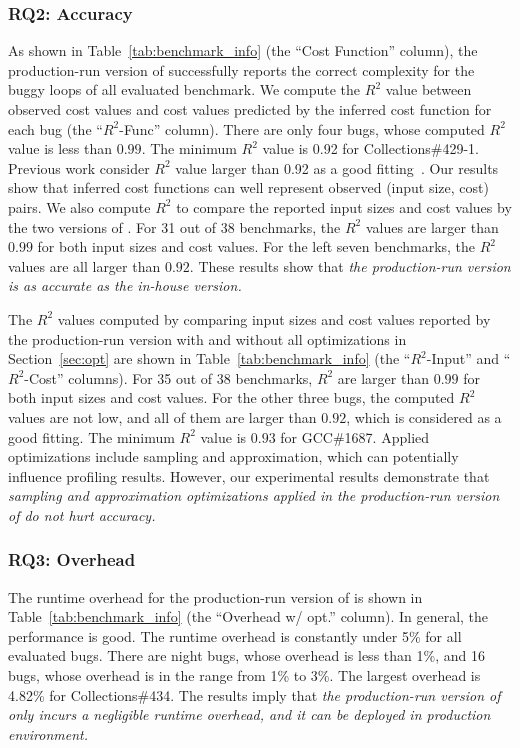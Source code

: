 \subsubsection{RQ2: Accuracy}
As shown in Table~\ref{tab:benchmark_info} (the ``Cost Function'' column),
the production-run version of \Tool successfully 
reports the correct complexity for the buggy loops of 
all evaluated benchmark. 
We compute the $R^2$ value between observed cost values and 
cost values predicted by the inferred cost function for each bug 
(the ``$R^2$-Func'' column).  
There are only four bugs, whose computed $R^2$ value is less than $0.99$.
The minimum $R^2$ value is 0.92 for Collections\#429-1. 
Previous work consider $R^2$ value larger than 0.92 
as a good fitting~\cite{rsquare-value}.
Our results show that inferred cost functions can well represent 
observed (input size, cost) pairs. 
We also compute $R^2$ to compare the reported input sizes 
and cost values by the two versions of \Tool. 
For 31 out of 38 benchmarks, 
the $R^2$ values are larger than $0.99$ for both input sizes and cost values. 
For the left seven benchmarks, the $R^2$ values are all larger than $0.92$. 
These results show that \emph{the production-run version is 
as accurate as the in-house version. 
}

The $R^2$ values computed by comparing input sizes and cost values 
reported by the production-run version with and without all 
optimizations in Section~\ref{sec:opt} are shown in 
Table~\ref{tab:benchmark_info} 
(the ``$R^2$-Input'' and ``$R^2$-Cost'' columns).
For 35 out of 38 benchmarks, $R^2$ are larger than $0.99$ for 
both input sizes and cost values. 
For the other three bugs, the computed $R^2$ values are not low, 
and all of them are larger than $0.92$, which is considered as a good fitting. 
The minimum $R^2$ value is $0.93$ for GCC\#1687.
Applied optimizations include
sampling and approximation, which can potentially influence profiling results.
However, our experimental results demonstrate that \emph{sampling and approximation 
optimizations
applied in the production-run version of \Tool do not hurt accuracy. 
}


\subsubsection{RQ3: Overhead}

The runtime overhead for the production-run version of \Tool is 
shown in Table~\ref{tab:benchmark_info} (the ``Overhead w/ opt.'' column). 
In general, the performance is good. 
The runtime overhead is constantly 
under 5\% for all evaluated bugs. 
There are night bugs, whose overhead is less than 1\%, 
and 16 bugs, whose overhead is in the range from 1\% to 3\%.  
The largest overhead is 4.82\% for Collections\#434. 
The results imply that \emph{the production-run version of \Tool only incurs a negligible runtime overhead, 
and it can be deployed in production environment.}

